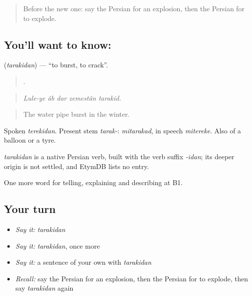 \label{lesson:FA-C329-tarakidan}



\begin{quote}
Before the new one: say the Persian for an explosion, then the Persian for to explode.
\end{quote}

\subsection*{You'll want to know: }
\textbf{} (\emph{tarakidan}) — \textquotedblleft{}to burst, to crack\textquotedblright{}.

\begin{quote}
    .
\end{quote}

\begin{quote}
\emph{Lule-ye âb dar zemestân tarakid.}
\end{quote}

\begin{quote}
The water pipe burst in the winter.
\end{quote}

Spoken \emph{terekidan}. Present stem \emph{tarak-}: \emph{mitarakad}, in speech \emph{mitereke}. Also of a balloon or a tyre.

\begin{cousinweb}
\emph{tarakidan} is a native Persian verb, built with the verb suffix \emph{-idan}; its deeper origin is not settled, and EtymDB lists no entry.
\end{cousinweb}

\begin{grammarlens}[title={What you've built}]
One more word for telling, explaining and describing at B1.
\end{grammarlens}

\subsection*{Your turn}
\begin{itemize}
\raggedright
  \item \emph{Say it:} \emph{tarakidan}
  \item \emph{Say it:} \emph{tarakidan}, once more
  \item \emph{Say it:} a sentence of your own with \emph{tarakidan}
  \item \emph{Recall:} say the Persian for an explosion, then the Persian for to explode, then say \emph{tarakidan} again
\end{itemize}

